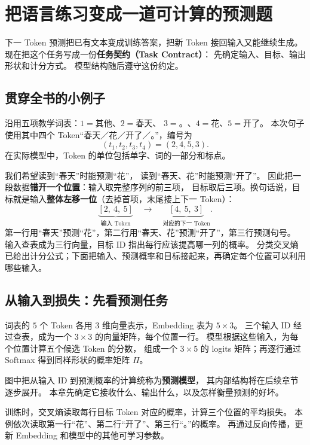 \chapterrule
\section{把语言练习变成一道可计算的预测题}
\label{intro:20b-task-contract}

下一 Token 预测把已有文本变成训练答案，把新 Token 接回输入又能继续生成。
现在把这个任务写成一份\textbf{任务契约（Task Contract）}：
先确定输入、目标、输出形状和计分方式。\label{concept:task-contract}
模型结构随后遵守这份约定。

\subsection{贯穿全书的小例子}

沿用五项教学词表：$1=\text{其他}$、$2=\text{春天}$、
$3=\text{。}$、$4=\text{花}$、$5=\text{开了}$。
本次句子使用其中四个 Token“春天／花／开了／。”，编号为
\[
(t_1,t_2,t_3,t_4)=(2,4,5,3).
\]
在实际模型中，Token 的单位包括单字、词的一部分和标点。

我们希望读到“春天”时能预测“花”，
读到“春天、花”时能预测“开了”。
因此把一段数据\textbf{错开一个位置}：输入取完整序列的前三项，
目标取后三项。换句话说，目标就是输入\textbf{整体左移一位}（去掉首项，末尾接上下一 Token）：
\[
\underbrace{[2,\ 4,\ 5]}_{\text{输入 Token}}
\quad\longrightarrow\quad
\underbrace{[4,\ 5,\ 3]}_{\text{对应的下一 Token}}.
\]
第一行用“春天”预测“花”，第二行用“春天、花”预测“开了”，第三行预测句号。
输入查表成为三行向量，目标 ID 指出每行应该提高哪一列的概率。
分类交叉熵已给出计分公式；下面把输入、预测概率和目标接起来，再确定每个位置可以利用哪些输入。

\subsection{从输入到损失：先看预测任务}

词表的 $5$ 个 Token 各用 $3$ 维向量表示，Embedding 表为 $5\times3$。
三个输入 ID 经过查表，成为一个 $3\times3$ 的向量矩阵，每个位置一行。
模型根据这些输入，为每个位置计算五个候选 Token 的分数，
组成一个 $3\times5$ 的 logits 矩阵；再逐行通过 Softmax 得到同样形状的概率矩阵 $\Pi$。

图中把从输入 ID 到预测概率的计算统称为\textbf{预测模型}，
其内部结构将在后续章节逐步展开。
本章先确定它接收什么、输出什么，以及怎样衡量预测的好坏。

训练时，交叉熵读取每行目标 Token 对应的概率，计算三个位置的平均损失。
本例依次读取第一行“花”、第二行“开了”、第三行“。”的概率。
再通过反向传播，更新 Embedding 和模型中的其他可学习参数。

